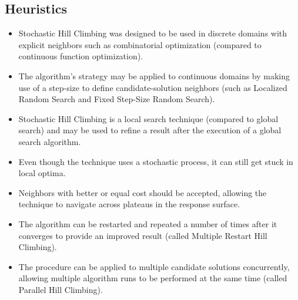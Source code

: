 \subsection{Heuristics}
\begin{itemize}
	\item Stochastic Hill Climbing was designed to be used in discrete domains with explicit neighbors such as combinatorial optimization (compared to continuous function optimization). 
	\item The algorithm's strategy may be applied to continuous domains by making use of a step-size to define candidate-solution neighbors (such as Localized Random Search and Fixed Step-Size Random Search).
	\item Stochastic Hill Climbing is a local search technique (compared to global search) and may be used to refine a result after the execution of a global search algorithm.
	\item Even though the technique uses a stochastic process, it can still get stuck in local optima.
	\item Neighbors with better or equal cost should be accepted, allowing the technique to navigate across plateaus in the response surface.
	\item The algorithm can be restarted and repeated a number of times after it converges to provide an improved result (called Multiple Restart Hill Climbing).
	\item The procedure can be applied to multiple candidate solutions concurrently, allowing multiple algorithm runs to be performed at the same time (called Parallel Hill Climbing).
\end{itemize}


